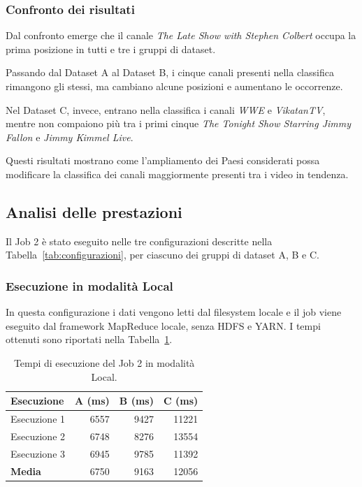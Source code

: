 \documentclass[12pt, a4paper]{article}
\begin{document}
\subsubsection{Confronto dei risultati}

Dal confronto emerge che il canale
\textit{The Late Show with Stephen Colbert}
occupa la prima posizione in tutti e tre
i gruppi di dataset.

Passando dal Dataset A al Dataset B,
i cinque canali presenti nella classifica
rimangono gli stessi, ma cambiano
alcune posizioni e aumentano le occorrenze.

Nel Dataset C, invece, entrano nella
classifica i canali \textit{WWE}
e \textit{VikatanTV}, mentre non compaiono
più tra i primi cinque
\textit{The Tonight Show Starring Jimmy Fallon}
e \textit{Jimmy Kimmel Live}.

Questi risultati mostrano come
l'ampliamento dei Paesi considerati
possa modificare la classifica dei canali
maggiormente presenti tra i video
in tendenza.

\subsection{Analisi delle prestazioni}

Il Job 2 è stato eseguito nelle tre configurazioni
descritte nella Tabella~\ref{tab:configurazioni},
per ciascuno dei gruppi di dataset A, B e C.

\subsubsection{Esecuzione in modalità Local}

In questa configurazione i dati vengono letti
dal filesystem locale e il job viene eseguito
dal framework MapReduce locale, senza HDFS e YARN.
I tempi ottenuti sono riportati nella
Tabella~\ref{tab:job2local}.

\begin{table}[H]
\centering
\small
\begin{tabular}{|l|r|r|r|}
\hline
\textbf{Esecuzione} &
\textbf{A (ms)} &
\textbf{B (ms)} &
\textbf{C (ms)} \\
\hline
Esecuzione 1 & 6557 & 9427 & 11221 \\
Esecuzione 2 & 6748 & 8276 & 13554 \\
Esecuzione 3 & 6945 & 9785 & 11392 \\
\hline
\textbf{Media} & 6750 & 9163 & 12056 \\
\hline
\end{tabular}
\caption{Tempi di esecuzione del Job 2 in modalità Local.}
\label{tab:job2local}
\end{table}
\end{document}
